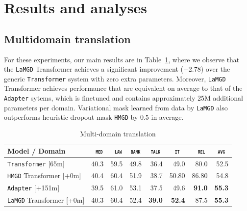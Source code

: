 \documentclass[11pt]{article}
\newcommand{\revision}[1]{\textcolor{black}{#1}}
\newcommand{\domain}[1]{\texttt{\textsc{#1}}}
\newcommand{\system}[1]{\texttt{{#1}}}
\newcommand{\SB}[1]{\textbf{#1}}
\begin{document}
\section{Results and analyses}

\subsection{Multidomain translation}
For these experiments, our main results are in Table~\ref{tab:mdmt}, where we observe that the \system{LaMGD} Transformer achieves a significant improvement (+2.78) over the generic \system{Transformer} system with zero extra parameters. Moreover, \system{LaMGD} Transformer achieves performance that are equivalent on average to that of the \system{Adapter} sytems, which is finetuned and contains approximately 25M additional parameters per domain. Variational mask learned from data by \system{LaMGD} also outperforms heuristic dropout mask \system{HMGD} by 0.5 in average.
\begin{table}[h!]
  \centering
  \begin{tabular}{|p{4cm}|*{7}{r|}} \hline
    Model / Domain & \multicolumn{1}{c|}{\domain{ med}} & \multicolumn{1}{c|}{\domain{ law}} & \multicolumn{1}{c|}{\domain{bank}} & \multicolumn{1}{c|}{\domain{talk}} & \multicolumn{1}{c|}{\domain{ it }} & \multicolumn{1}{c|}{\domain{ rel}} & \multicolumn{1}{c|}{\domain{avg}} \\ \hline 
    \system{Transformer}  \hfill{\footnotesize[65m]} & 40.3 & 59.5 & 49.8 & 36.4 & 49.0 & 80.0  & 52.5\\
    \system{HMGD} Transformer   \hfill{\footnotesize[+0m]}  & 40.4 & 60.4 & 51.9 & 38.7 &	50.80 &	86.80 & 54.8 \\ 
    \revision{\system{Adapter}}   \hfill{\footnotesize[+151m]}  & 39.5 & 61.0 & 53.1 & 37.5 & 49.6 & \SB{91.0} & \SB{55.3} \\ 
    \system{LaMGD} Transformer   \hfill{\footnotesize[+0m]}  & 40.3 & 60.4 & 52.4 & \SB{39.0} & \SB{52.4} & 87.5 & \SB{55.3} \\ 
    \hline
  \end{tabular}
  \caption{Multi-domain translation}
  \label{tab:mdmt}
\end{table}
\end{document}
